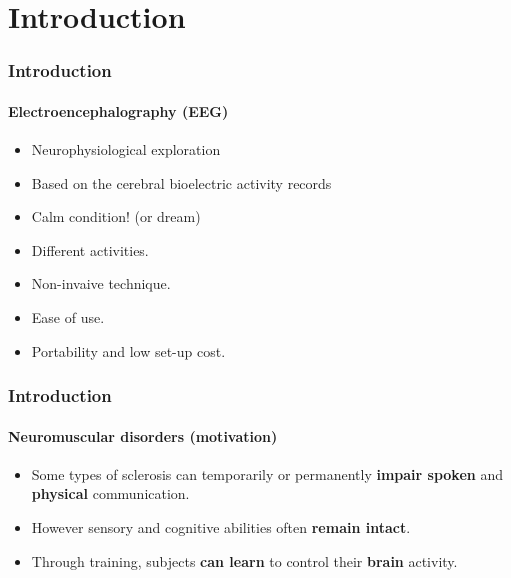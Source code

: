 \section{Introduction}
\frame
{
\frametitle{Introduction}
\framesubtitle{Electroencephalography (EEG)}
\begin{itemize}
	\item Neurophysiological exploration
	\item Based on the cerebral bioelectric activity records
	\item Calm condition! (or dream)
	\item Different activities.
	\item Non-invaive technique.
	\item Ease of use.
	\item Portability and low set-up cost.
\end{itemize}
}

\frame
{
\frametitle{Introduction}
\framesubtitle{Neuromuscular disorders (motivation)}
\begin{itemize}
	\item Some types of sclerosis can temporarily or permanently \textbf{impair spoken} and \textbf{physical} communication.
	\item However sensory and cognitive abilities often \textbf{remain intact}.
	\item Through training, subjects \textbf{can learn} to control their \textbf{brain} activity.
\end{itemize}

}
